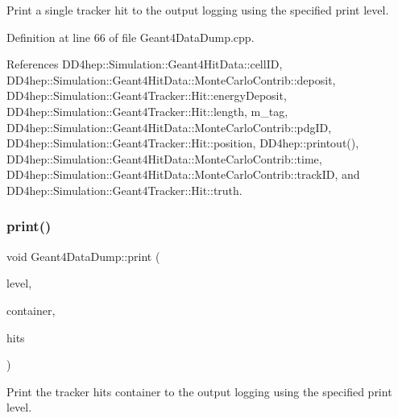 Print a single tracker hit to the output logging using the specified print level. 



Definition at line 66 of file Geant4\+Data\+Dump.\+cpp.



References D\+D4hep\+::\+Simulation\+::\+Geant4\+Hit\+Data\+::cell\+ID, D\+D4hep\+::\+Simulation\+::\+Geant4\+Hit\+Data\+::\+Monte\+Carlo\+Contrib\+::deposit, D\+D4hep\+::\+Simulation\+::\+Geant4\+Tracker\+::\+Hit\+::energy\+Deposit, D\+D4hep\+::\+Simulation\+::\+Geant4\+Tracker\+::\+Hit\+::length, m\+\_\+tag, D\+D4hep\+::\+Simulation\+::\+Geant4\+Hit\+Data\+::\+Monte\+Carlo\+Contrib\+::pdg\+ID, D\+D4hep\+::\+Simulation\+::\+Geant4\+Tracker\+::\+Hit\+::position, D\+D4hep\+::printout(), D\+D4hep\+::\+Simulation\+::\+Geant4\+Hit\+Data\+::\+Monte\+Carlo\+Contrib\+::time, D\+D4hep\+::\+Simulation\+::\+Geant4\+Hit\+Data\+::\+Monte\+Carlo\+Contrib\+::track\+ID, and D\+D4hep\+::\+Simulation\+::\+Geant4\+Tracker\+::\+Hit\+::truth.

\hypertarget{class_d_d4hep_1_1_simulation_1_1_geant4_data_dump_a2427e186357f34940bb19be59406e7c9}{}\label{class_d_d4hep_1_1_simulation_1_1_geant4_data_dump_a2427e186357f34940bb19be59406e7c9} 
\subsubsection{\texorpdfstring{print()}{print()}\hspace{0.1cm}{\footnotesize\ttfamily [4/6]}}
{\footnotesize\ttfamily void Geant4\+Data\+Dump\+::print (\begin{DoxyParamCaption}\item[{\hyperlink{namespace_d_d4hep_a5b5a64d56252469451f2020a27d57d42}{Print\+Level}}]{level,  }\item[{const std\+::string \&}]{container,  }\item[{const \hyperlink{class_d_d4hep_1_1_simulation_1_1_geant4_data_dump_aa71f3341672792aa15c10e82cdbeca4b}{Tracker\+Hits} $\ast$}]{hits }\end{DoxyParamCaption})}



Print the tracker hits container to the output logging using the specified print level. 



